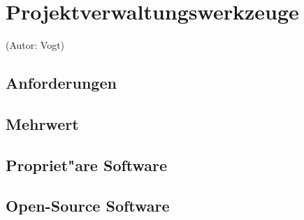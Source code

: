 \section{Projektverwaltungswerkzeuge}
(Autor: Vogt)\\

\subsection{Anforderungen}

\subsection{Mehrwert}

\subsection{Propriet"are Software}

\subsection{Open-Source Software}

